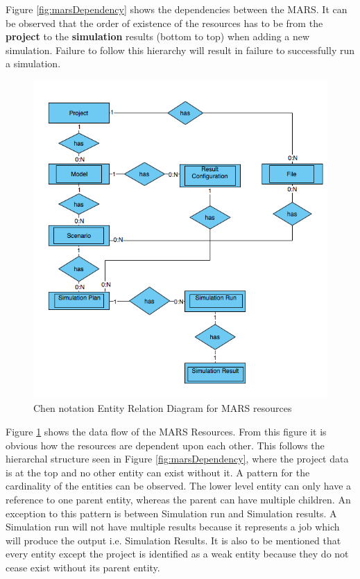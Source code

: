         Figure \ref{fig:marsDependency} shows the dependencies between the MARS. It can be observed
        that the order of existence of the resources has to be from the \textbf{project} to the \textbf{simulation} results 
        (bottom to top) when adding a new simulation. Failure to follow this hierarchy will result in failure to
        successfully run a simulation.

        \begin{figure}[H]
            \centering \includegraphics[scale=0.6]{grafiken/ERMars.png}
            \caption{Chen notation Entity Relation Diagram for MARS resources}
            \label{fig:ERMars}
        \end{figure}
        
        Figure \ref{fig:ERMars} shows the data flow of the MARS Resources. From this figure it is obvious 
        how the resources are dependent upon each other. This follows the hierarchal structure seen in Figure \ref{fig:marsDependency},
        where the project data is at the top and no other entity can exist without it. A pattern for the cardinality of the entities can be observed.
        The lower level entity can only have a reference to one parent entity, whereas the parent can have multiple children. An exception to this
        pattern is between Simulation run and Simulation results. A Simulation run will not have multiple results because it represents a job which will produce
        the output i.e. Simulation Results. It is also to be mentioned that every entity except the project is identified as a weak entity because they do not cease
        exist without its parent entity. 

